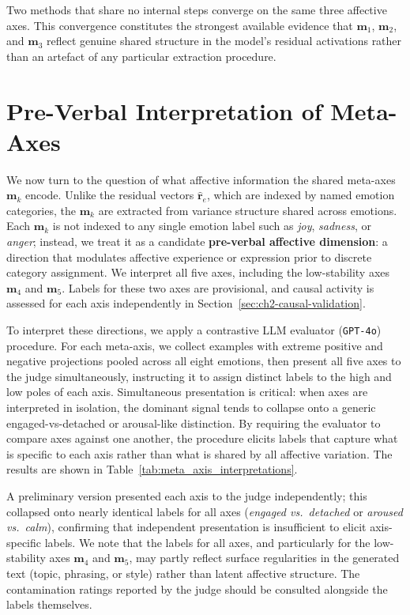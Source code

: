 Two methods that share no internal steps converge on the same three affective axes. This convergence constitutes the strongest available evidence that $\mathbf{m}_1$, $\mathbf{m}_2$, and $\mathbf{m}_3$ reflect genuine shared structure in the model's residual activations rather than an artefact of any particular extraction procedure.\par


\section{Pre-Verbal Interpretation of Meta-Axes}
\label{sec:ch2-preverbal-interp}

We now turn to the question of what affective information the shared meta-axes $\mathbf{m}_k$ encode. Unlike the residual vectors $\hat{\mathbf{r}}_e$, which are indexed by named emotion categories, the $\mathbf{m}_k$ are extracted from variance structure shared across emotions. Each $\mathbf{m}_k$ is not indexed to any single emotion label such as \textit{joy}, \textit{sadness}, or \textit{anger}; instead, we treat it as a candidate \textbf{pre-verbal affective dimension}: a direction that modulates affective experience or expression prior to discrete category assignment. We interpret all five axes, including the low-stability axes $\mathbf{m}_4$ and $\mathbf{m}_5$. Labels for these two axes are provisional, and causal activity is assessed for each axis independently in Section~\ref{sec:ch2-causal-validation}.\par

To interpret these directions, we apply a contrastive LLM evaluator (\texttt{GPT-4o}) procedure. For each meta-axis, we collect examples with extreme positive and negative projections pooled across all eight emotions, then present all five axes to the judge simultaneously, instructing it to assign distinct labels to the high and low poles of each axis. Simultaneous presentation is critical: when axes are interpreted in isolation, the dominant signal tends to collapse onto a generic engaged-vs-detached or arousal-like distinction. By requiring the evaluator to compare axes against one another, the procedure elicits labels that capture what is specific to each axis rather than what is shared by all affective variation. The results are shown in Table~\ref{tab:meta_axis_interpretations}.\par

A preliminary version presented each axis to the judge independently; this collapsed onto nearly identical labels for all axes (\textit{engaged vs.\ detached} or \textit{aroused vs.\ calm}), confirming that independent presentation is insufficient to elicit axis-specific labels. We note that the labels for all axes, and particularly for the low-stability axes $\mathbf{m}_4$ and $\mathbf{m}_5$, may partly reflect surface regularities in the generated text (topic, phrasing, or style) rather than latent affective structure. The contamination ratings reported by the judge should be consulted alongside the labels themselves.\par

